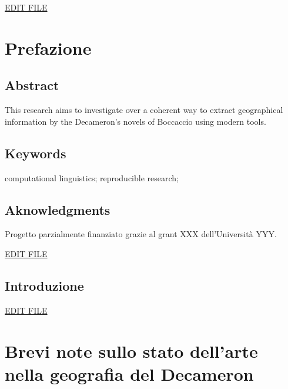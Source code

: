 \href{https://github.com/olablit2/geoBoccaccio/edit/master/docs/2018-article/05-preface.md}{EDIT
FILE}

\section{Prefazione}\label{prefazione}

\subsection{Abstract}\label{abstract}

This research aims to investigate over a coherent way to extract
geographical information by the Decameron's novels of Boccaccio using
modern tools.

\subsection{Keywords}\label{keywords}

computational linguistics; reproducible research;

\subsection{Aknowledgments}\label{aknowledgments}

Progetto parzialmente finanziato grazie al grant XXX dell'Università
YYY.

\href{https://github.com/olablit2/geoBoccaccio/edit/master/docs/2018-article/10-introduction.md}{EDIT
FILE}

\subsection{Introduzione}\label{introduzione}

\href{https://github.com/olablit2/geoBoccaccio/edit/master/docs/2018-article/20-chapter1.md}{EDIT
FILE}

\section{Brevi note sullo stato dell'arte nella geografia del
Decameron}\label{brevi-note-sullo-stato-dellarte-nella-geografia-del-decameron}

